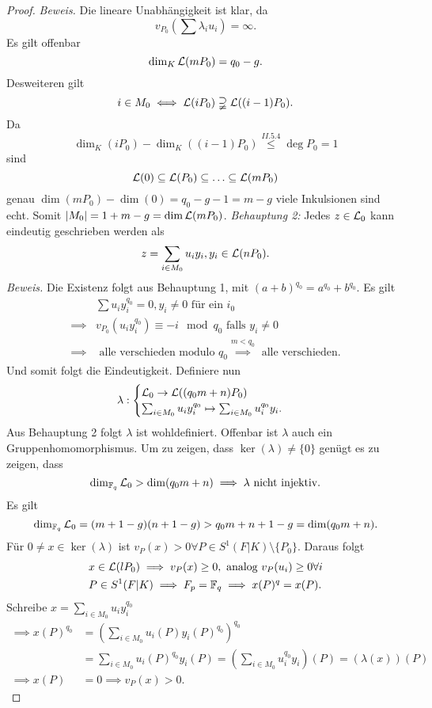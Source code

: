 \begin{proof}
    \emph{Beweis.} Die lineare Unabhängigkeit ist klar, da $$ v_{P_0}(\sum \lambda_i u_i) = \infty.$$
    Es gilt offenbar
    $$ \dim_K \mathcal{L}(mP_0) = q_0 -g.$$
    Desweiteren gilt
    $$ i \in M_0 \iff \mathcal{L}(iP_0) \supsetneqq \mathcal{L}((i-1)P_0).$$
    Da $$\dim_K(iP_0) - \dim_K ((i-1)P_0) \stackrel{II.5.4}{\leq} \deg P_0 = 1$$ 
    sind $$ \mathcal{L}(0) \subseteq \mathcal{L} (P_0) \subseteq \ldots \subseteq \mathcal{L}(mP_0)$$
    genau $\dim(mP_0) - \dim (0) = q_0 - g -1 = m-g$ viele Inkulsionen sind echt.
    Somit $|M_0| = 1 + m -g = \dim \mathcal{L}(mP_0)$.\nl\nl
    \emph{Behauptung 2:} Jedes $z \in \mathcal{L}_0$ kann eindeutig geschrieben werden als 
    $$ z = \sum_{i \in M_0} u_i y_i, y_i \in \mathcal{L}(nP_0).$$
    \emph{Beweis.} Die Existenz folgt aus Behauptung 1, mit $(a+b)^{q_0} = a^{q_0} + b^{q_0}$. 
    Es gilt
    \begin{align*}
        &\sum u_i y_i^{q_0} = 0, y_i \ne 0 \text{ für ein } i_0\\
        \implies & v_{P_0} (u_iy_i^{q_0}) \equiv -i \mod q_0 \text{ falls } y_i \ne 0\\
        \implies & \text{ alle verschieden modulo } q_0 \stackrel{m < q_0}{\implies} \text{ alle verschieden}.
    \end{align*}
    Und somit folgt die Eindeutigkeit.\nl\nl
    Definiere nun
    $$ \lambda: \begin{cases}
        \mathcal{L}_0 \to \mathcal{L}((q_0m+n)P_0)\\
        \sum_{i\in M_0}u_iy_i^{q_0} \mapsto \sum_{i\in M_0}u_i^{q_0}y_i.
    \end{cases}$$
    Aus Behauptung 2 folgt $\lambda$ ist wohldefiniert. Offenbar ist $\lambda$ auch ein Gruppenhomomorphismus.
    Um zu zeigen, dass $\ker (\lambda) \ne \{0\}$ genügt es zu zeigen, dass
    $$ \dim_{\mathbb{F}_q} \mathcal{L}_0 > \dim (q_0m+n) \implies \lambda \text{ nicht injektiv}.$$
    Es gilt 
    $$ \dim_{\mathbb{F}_q} \mathcal{L}_0 = (m+1-g)(n+1-g) > q_0m + n + 1 -g = \dim (q_0m + n). $$
    Für $0 \ne x \in \ker (\lambda)$ ist $v_P (x) > 0 \forall P\in S^1(F|K)\setminus \{P_0\}$.
    Daraus folgt
    \begin{align*}
        &x \in \mathcal{L}(lP_0) \implies v_P(x) \geq 0, \text{ analog } v_P(u_i) \geq 0 \forall i\\
        &P \in S^1(F|K) \implies F_p = \mathbb{F}_q \implies x(P)^q = x(P).
    \end{align*}
    Schreibe $x = \sum\limits_{i \in M_0} u_i y_i^{q_0}$
    \begin{align*}
        \implies x(P)^{q_0} &= \left(\sum_{i \in M_0} u_i(P) y_i(P)^{q_0}\right)^{q_0} \\
        &= \sum_{i \in M_0} u_i(P)^{q_0} y_i(P) = \left(\sum_{i \in M_0} u_i^{q_0} y_i\right)(P) = (\lambda(x))(P)\\
        \implies x(P) &= 0 \implies v_P(x) > 0.
    \end{align*}
\end{proof}

